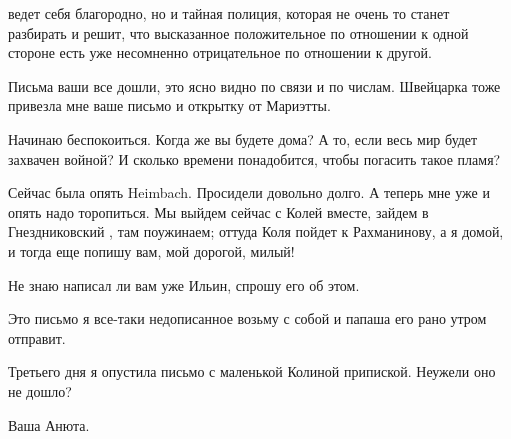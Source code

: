
\noindent
ведет себя благородно, но и тайная полиция, которая не очень то станет
разбирать и решит, что высказанное положительное по отношении к одной стороне
есть уже несомненно отрицательное по отношении к другой.

Письма ваши все дошли, это ясно видно по связи и по числам. Швейцарка тоже
привезла мне ваше письмо и открытку от Мариэтты.

Начинаю беспокоиться. Когда же вы будете дома? А то, если весь мир будет
захвачен войной? И сколько времени понадобится, чтобы погасить такое пламя?

Сейчас была опять Heimbach. Просидели довольно долго. А теперь мне уже и опять
надо торопиться. Мы выйдем сейчас с Колей вместе, зайдем в Гнездниковский
, там поужинаем; оттуда Коля пойдет к Рахманинову, а я домой, и
тогда еще попишу вам, мой дорогой, милый!


Не знаю написал ли вам уже Ильин, спрошу его об этом.

Это письмо я все-таки недописанное возьму с собой и папаша его рано утром
отправит.

Третьего дня я опустила письмо с маленькой Колиной припиской. Неужели оно не
дошло?

Ваша Анюта.
